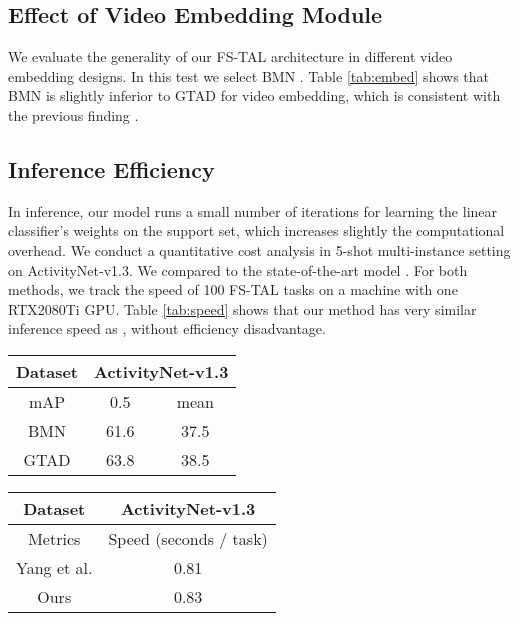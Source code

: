 \documentclass{bmvc2k}
\begin{document}
\subsection{Effect of Video Embedding Module}
We evaluate the generality of our FS-TAL architecture in different video embedding designs.
In this test we select BMN \cite{lin2019bmn}.
Table \ref{tab:embed} shows that BMN is slightly inferior to GTAD for video embedding, which is consistent with the previous finding \cite{xu2020gtad}.


\subsection{Inference Efficiency}
In inference, our model runs a small number of iterations
for learning the linear classifier's weights on the support set, which increases slightly
the computational overhead. 
We conduct a quantitative cost analysis 
in 5-shot multi-instance setting on ActivityNet-v1.3.
We compared to the state-of-the-art model \cite{yang2020localizing}.
For both methods, we track the speed of 100 FS-TAL tasks
on a machine with one RTX2080Ti GPU.
Table \ref{tab:speed} shows that
our method has very similar inference speed as \cite{yang2020localizing},
without efficiency disadvantage.

\begin{minipage}{0.95\textwidth}
\vspace{0.15in}
  \begin{minipage}[b]{0.42\columnwidth}
    \centering
    \small
\begin{tabular}{@{}c|c|c@{}}
\toprule
    Dataset  & \multicolumn{2}{c}{ActivityNet-v1.3} \\ \midrule
    mAP & 0.5         & mean        \\ \midrule
    BMN \cite{lin2019bmn}     & 61.6 & 37.5  \\
    GTAD \cite{xu2020gtad}    & 63.8 & 38.5  \\ \bottomrule
    \end{tabular}
\vspace{0.15in}
    \label{tab:embed}
\end{minipage}
  \hfill
 \begin{minipage}[b]{0.53\textwidth}
    \centering
    \small
\begin{tabular}{@{}c|c@{}}
\toprule
    Dataset  & {ActivityNet-v1.3} \\ \midrule
    Metrics & Speed (seconds / task)      \\ \midrule
    Yang et al. \cite{yang2020localizing}     
    & 0.81  \\
    Ours    
    & 0.83  \\ \bottomrule
    \end{tabular}
\vspace{0.15in}
    \label{tab:speed}
\end{minipage}
\end{minipage}
\end{document}
